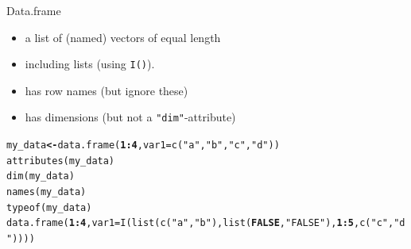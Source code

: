 \documentclass{beamer}\usepackage[]{graphicx}\usepackage[]{color}
\makeatletter
\newcommand{\hlnum}[1]{\textcolor[rgb]{0.502,0,0.502}{\textbf{#1}}}%
\newcommand{\hlstr}[1]{\textcolor[rgb]{0.651,0.522,0}{#1}}%
\newcommand{\hlopt}[1]{\textcolor[rgb]{1,0,0.502}{\textbf{#1}}}%
\newcommand{\hlstd}[1]{\textcolor[rgb]{0,0,0}{#1}}%
\newcommand{\hlkwb}[1]{\textcolor[rgb]{0.502,0.502,0.753}{\textbf{#1}}}%
\newcommand{\hlkwc}[1]{\textcolor[rgb]{0,0.502,0.753}{#1}}%
\newcommand{\hlkwd}[1]{\textcolor[rgb]{0,0.267,0.4}{#1}}%
\newenvironment{kframe}{%
 \def\at@end@of@kframe{}%
 \ifinner\ifhmode%
  \def\at@end@of@kframe{\end{minipage}}%
  \begin{minipage}{\columnwidth}%
 \fi\fi%
 \def\FrameCommand##1{\hskip\@totalleftmargin \hskip-\fboxsep
 \colorbox{shadecolor}{##1}\hskip-\fboxsep
     \hskip-\linewidth \hskip-\@totalleftmargin \hskip\columnwidth}%
 \MakeFramed {\advance\hsize-\width
   \@totalleftmargin\z@ \linewidth\hsize
   \@setminipage}}%
 {\par\unskip\endMakeFramed%
 \at@end@of@kframe}
\newenvironment{knitrout}{}{} %
\makeatother
\begin{document}
\begin{frame}[fragile]{Data.frame}

\begin{itemize}
  \item a list of (named) vectors of equal length
  \item including lists (using \texttt{I()}).
  \item has row names (but ignore these)
  \item has dimensions (but not a \texttt{"dim"}-attribute)
\end{itemize}

\begin{knitrout}
\color{fgcolor}\begin{kframe}
\begin{alltt}
\hlstd{my_data}  \hlkwb{<-} \hlkwd{data.frame}\hlstd{(}\hlnum{1}\hlopt{:}\hlnum{4}\hlstd{,} \hlkwc{var1} \hlstd{=} \hlkwd{c}\hlstd{(}\hlstr{"a"}\hlstd{,} \hlstr{"b"}\hlstd{,} \hlstr{"c"}\hlstd{,} \hlstr{"d"}\hlstd{))}
\hlkwd{attributes}\hlstd{(my_data)}
\hlkwd{dim}\hlstd{(my_data)}
\hlkwd{names}\hlstd{(my_data)}
\hlkwd{typeof}\hlstd{(my_data)}
\hlkwd{data.frame}\hlstd{(}\hlnum{1}\hlopt{:}\hlnum{4}\hlstd{,} \hlkwc{var1} \hlstd{=} \hlkwd{I}\hlstd{(}\hlkwd{list}\hlstd{(}\hlkwd{c}\hlstd{(}\hlstr{"a"}\hlstd{,} \hlstr{"b"}\hlstd{),} \hlkwd{list}\hlstd{(}\hlnum{FALSE}\hlstd{,} \hlstr{"FALSE"}\hlstd{) ,} \hlnum{1}\hlopt{:}\hlnum{5}\hlstd{,} \hlkwd{c}\hlstd{(}\hlstr{"c"}\hlstd{,} \hlstr{"d"}\hlstd{))))}
\end{alltt}
\end{kframe}
\end{knitrout}

\end{frame}
\end{document}

